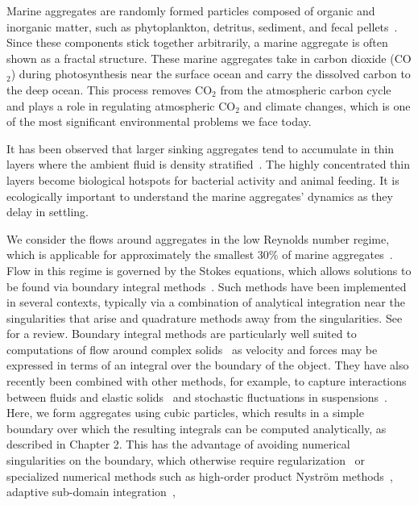 Marine aggregates are randomly formed particles composed of organic and inorganic matter, such as phytoplankton, detritus, sediment, and fecal pellets~\cite{jackson_simulation_1989}. Since these components stick together arbitrarily, a marine aggregate is often shown as a fractal structure. 
These marine aggregates take in carbon dioxide (CO$_2$) during photosynthesis near the surface ocean and carry the dissolved carbon to the deep ocean. 
This process removes CO$_2$ from the atmospheric carbon cycle~\cite{honjo_understanding_2014} and plays a role in regulating atmospheric CO$_2$ and climate changes, which is one of the most significant environmental problems we face today. 
 \par
 It has been observed that larger sinking aggregates tend to accumulate in thin layers where the ambient fluid is density stratified~\cite{alldredge_occurrence_2002}. The highly concentrated thin layers become biological hotspots for bacterial activity and animal feeding. It is ecologically important to understand the marine aggregates' dynamics as they delay in settling.
\par
We consider the flows around aggregates in the low Reynolds number regime, which is applicable for approximately the smallest 30\% of marine aggregates~\cite{alldredge_situ_1988}. Flow in this regime is governed by the Stokes equations, which allows solutions to be found via boundary integral methods~\cite{pozrikidis_boundary_1992}. Such methods have been implemented in several contexts, typically via a combination of analytical integration near the singularities that arise and quadrature methods away from the singularities. See~\cite{pozrikidis_boundary_1992} for a review. Boundary integral methods
are particularly well suited to computations of flow around complex solids~\cite{zinchenko_boundary-integral_2006}  as velocity and forces may be expressed in terms of an integral over the boundary of the object. 
They have also recently been combined with other methods, for example, to capture interactions between fluids and elastic solids~\cite{bao_immersed_2017} and stochastic fluctuations in suspensions~\cite{bao_fluctuating_2018}.
Here, we form aggregates using cubic particles, which results in a simple boundary over which the resulting integrals can be computed analytically, as described in Chapter 2.
This has the advantage of avoiding numerical singularities on the boundary, which otherwise require regularization~\cite{cortez_method_2001} or specialized numerical methods such as high-order product Nystr\"{o}m methods~\cite{atkinson_numerical_1997, delves_computational_1985}, adaptive sub-domain integration~\cite{chan_second-order_1992},

